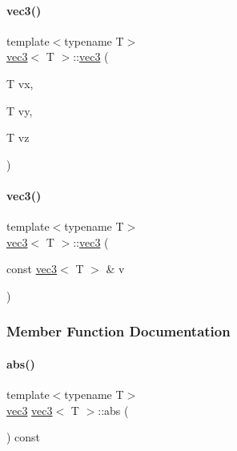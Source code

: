 \paragraph{\texorpdfstring{vec3()}{vec3()}\hspace{0.1cm}{\footnotesize\ttfamily [2/3]}}
{\footnotesize\ttfamily template$<$typename T$>$ \\
\mbox{\hyperlink{structvec3}{vec3}}$<$ T $>$\+::\mbox{\hyperlink{structvec3}{vec3}} (\begin{DoxyParamCaption}\item[{T}]{vx,  }\item[{T}]{vy,  }\item[{T}]{vz }\end{DoxyParamCaption})\hspace{0.3cm}{\ttfamily [inline]}}

\mbox{\label{structvec3_ac0d73cf98ccc9b3cb39e6f58e92dab9f}} 
\paragraph{\texorpdfstring{vec3()}{vec3()}\hspace{0.1cm}{\footnotesize\ttfamily [3/3]}}
{\footnotesize\ttfamily template$<$typename T$>$ \\
\mbox{\hyperlink{structvec3}{vec3}}$<$ T $>$\+::\mbox{\hyperlink{structvec3}{vec3}} (\begin{DoxyParamCaption}\item[{const \mbox{\hyperlink{structvec3}{vec3}}$<$ T $>$ \&}]{v }\end{DoxyParamCaption})\hspace{0.3cm}{\ttfamily [inline]}}



\subsubsection{Member Function Documentation}
\mbox{\label{structvec3_abf0d30ac0a81beeacd36ddc86ec6ee83}} 
\paragraph{\texorpdfstring{abs()}{abs()}}
{\footnotesize\ttfamily template$<$typename T$>$ \\
\mbox{\hyperlink{structvec3}{vec3}} \mbox{\hyperlink{structvec3}{vec3}}$<$ T $>$\+::abs (\begin{DoxyParamCaption}{ }\end{DoxyParamCaption}) const\hspace{0.3cm}{\ttfamily [inline]}}



